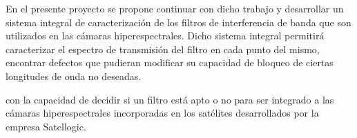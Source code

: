 \documentclass{ctuthesis}
\begin{document}
En el presente proyecto se propone continuar con dicho trabajo y desarrollar un 
sistema integral de caracterización de los filtros de interferencia de banda 
que son utilizados en las cámaras hiperespectrales. Dicho sistema integral 
permitirá caracterizar el espectro de transmisión del filtro en cada punto del 
mismo, encontrar defectos que pudieran modificar su capacidad de bloqueo de 
ciertas longitudes de onda no deseadas.

  con la 
capacidad de decidir si un filtro está apto o no para ser integrado a las 
cámaras hiperespectrales incorporadas en los satélites desarrollados por la 
empresa Satellogic.



\end{document}
